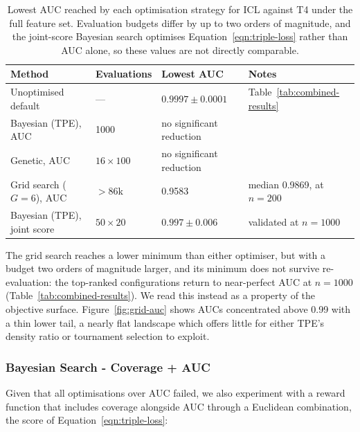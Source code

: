 \documentclass{article}
\begin{document}
\begin{table}[ht]
\centering
\caption{Lowest AUC reached by each optimisation strategy for ICL against T4 under the full feature set. Evaluation budgets differ by up to two orders of magnitude, and the joint-score Bayesian search optimises Equation~\ref{eqn:triple-loss} rather than AUC alone, so these values are not directly comparable.}
\label{tab:optimiser-comparison}
\small
\begin{tabular}{llll}
\toprule
Method & Evaluations & Lowest AUC & Notes \\
\midrule
Unoptimised default & --- & $0.9997 \pm 0.0001$ & Table~\ref{tab:combined-results} \\
Bayesian (TPE), AUC & 1000 & no significant reduction & \\
Genetic, AUC & $16 \times 100$ & no significant reduction & \\
Grid search ($G = 6$), AUC & $>86$k & 0.9583 & median 0.9869, at $n = 200$ \\
Bayesian (TPE), joint score & $50 \times 20$ & $0.997 \pm 0.006$ & validated at $n = 1000$ \\
\bottomrule
\end{tabular}
\end{table}

The grid search reaches a lower minimum than either optimiser, but with a budget two orders of magnitude larger, and its minimum does not survive re-evaluation: the top-ranked configurations return to near-perfect AUC at $n = 1000$ (Table~\ref{tab:combined-results}).
We read this instead as a property of the objective surface.
Figure~\ref{fig:grid-auc} shows AUCs concentrated above 0.99 with a thin lower tail, a nearly flat landscape which offers little for either TPE's density ratio or tournament selection to exploit.




\subsubsection{Bayesian Search - Coverage + AUC}
\label{app:opt-triple}


Given that all optimisations over AUC failed, we also experiment with a reward function that includes coverage alongside AUC through a Euclidean combination, the score of Equation~\ref{eqn:triple-loss}:
\end{document}
